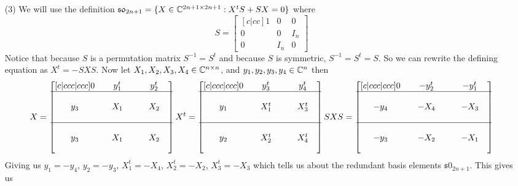 \documentclass[12pt]{amsart}
\begin{document}
\begin{itemize}
    \item[(3)]
    We will use the definition $\mathfrak{s0}_{2n+1}=\{X\in \mathbb{C}^{2n+1\times 2n+1}: X^tS+SX=0\}$ where 
    \[S=\begin{bmatrix}[c|cc]
        1 &0 &0\\
        \hline
        0 &0 &I_n\\
        0 &I_n& 0
    \end{bmatrix}\]
    Notice that because $S$ is a permutation matrix $S^{-1}=S^t$ and because 
    $S$ is symmetric, $S^{-1}=S^t=S$. So we can rewrite the defining equation as $X^t=-SXS$.
    Now let $X_1,X_2,X_3,X_4\in \mathbb{C}^{n\times n}$, and $y_1,y_2,y_3,y_4\in \mathbb{C}^n$ then 
    \[X=\begin{bmatrix}[c|ccc|ccc]
        0 &&y_1^t&&&y_2^t&\\
        \hline
        &&&&&&\\
        y_3&&X_1&&&X_2&\\
        &&&&&&\\
        \hline
        &&&&&&\\
        y_3&&X_1&&&X_2&\\
        &&&&&&\\
    \end{bmatrix} X^t=\begin{bmatrix}[c|ccc|ccc]
        0 &&y_3^t&&&y_4^t&\\
        \hline
        &&&&&&\\
        y_1&&X_1^t&&&X_3^t&\\
        &&&&&&\\
        \hline
        &&&&&&\\
        y_2&&X_2^t&&&X_4^t&\\
        &&&&&&\\
    \end{bmatrix} SXS=\begin{bmatrix}[c|ccc|ccc]
        0 &&-y_2^t&&&-y_1^t&\\
        \hline
        &&&&&&\\
        -y_4&&-X_4&&&-X_3&\\
        &&&&&&\\
        \hline
        &&&&&&\\
        -y_3&&-X_2&&&-X_1&\\
        &&&&&&\\
    \end{bmatrix}\]
    Giving us $y_1=-y_4$, $y_2=-y_3$, $X_1^t=-X_4$, $X_2^t=-X_2$, $X_3^t=-X_3$ which tells 
    us about the redundant basis elements $\mathfrak{s0}_{2n+1}$. This gives us 

\end{itemize}
\end{document}
